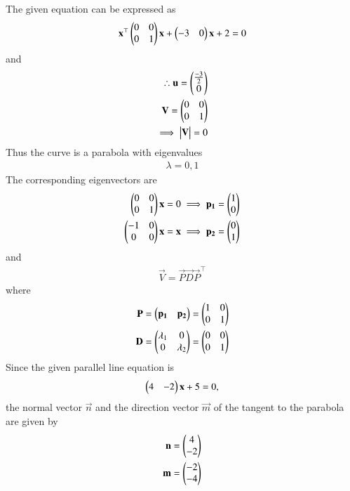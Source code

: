The given equation can be expressed as 
\begin{align}
    \mathbf{x}^{\top}\begin{pmatrix}0&0 \\ 0&1\end{pmatrix}\mathbf{x}+\begin{pmatrix}-3&0\end{pmatrix}\mathbf{x}+2=0 \label{quadform/82/eq:giveneq}
\end{align}
and 
\begin{align}
\therefore \mathbf{u}=\begin{pmatrix}\frac{-3}{2} \\ 0\end{pmatrix}
\\
\mathbf{V} =\begin{pmatrix}0&0 \\ 0&1\end{pmatrix}
\\
\implies {\ensuremath{\begin{vmatrix}\mathbf{V}\end{vmatrix}}}=0
\end{align}
Thus the curve is a parabola with eigenvalues 
\begin{align}
 \lambda= 0,1
\end{align}
The corresponding  eigenvectors are 
\begin{align}
    \begin{pmatrix}0&0 \\ 0&1\end{pmatrix}\mathbf{x} = 0\implies \mathbf{p_{1}}= \begin{pmatrix}1 \\ 0\end{pmatrix}
    \\
    \begin{pmatrix}-1&0 \\ 0&0\end{pmatrix}\mathbf{x} = \mathbf{x}\implies \mathbf{p_{2}}= \begin{pmatrix}0 \\ 1\end{pmatrix}
\end{align}
and 
\begin{align}
    \vec{V} = \vec{P}\vec{D}\vec{P}^{\top}\label{quadform/82/eq:eqn1}
\end{align}
where 
\begin{align}
 \mathbf{P} = \begin{pmatrix}\mathbf{p_{1}} & \mathbf{p_{2}}\end{pmatrix} = \begin{pmatrix}1&0 \\ 0&1\end{pmatrix}
 \\
 \mathbf{D}=\begin{pmatrix}\lambda_{1}&0 \\ 0&\lambda_{2}\end{pmatrix} = \begin{pmatrix}0&0 \\ 0&1\end{pmatrix}
\end{align}
Since the given parallel line equation  is 
\begin{align}
 \begin{pmatrix}4&-2\end{pmatrix}\mathbf{x} + 5 = 0, \label{quadform/82/eq:eqn2}
\end{align}
the normal vector $\vec{n}$ and the direction vector $\vec{m}$ of the tangent to the parabola are given by 
\begin{align}
    \mathbf{n}=\begin{pmatrix}4 \\ -2\end{pmatrix} \label{quadform/82/eq:eqn5}
    \\
    \mathbf{m}=\begin{pmatrix}-2 \\ -4\end{pmatrix}
\end{align}
